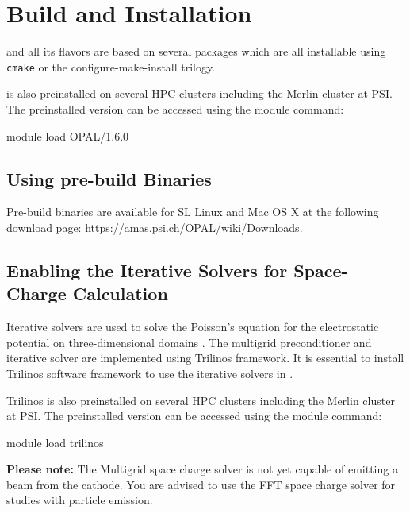 

\chapter{Build and Installation}
\label{chp:installation}
\opal and all its flavors are based on several packages which are all installable using \texttt{cmake} or the configure-make-install trilogy.

\opal is also preinstalled on several HPC clusters including the Merlin cluster at PSI. The preinstalled version can be accessed
using the module command:
\begin{footnotesize}
\begin{example}
module load OPAL/1.6.0
\end{example}
\end{footnotesize}

\section{Using pre-build Binaries}
Pre-build binaries are available for SL Linux  and Mac OS X at the following download page: \url{https://amas.psi.ch/OPAL/wiki/Downloads}.

\section{Enabling the Iterative Solvers for Space-Charge Calculation}

Iterative solvers are used to solve the Poisson's equation for the electrostatic potential
on three-dimensional domains \cite{Adelmann:2009p543}.
The multigrid preconditioner and iterative solver are implemented using Trilinos framework. It is essential to install
Trilinos software framework to use the iterative solvers in \opal.

Trilinos is also preinstalled on several HPC clusters including the Merlin cluster at PSI. The preinstalled version can be accessed
using the module command:
\begin{footnotesize}
\begin{example}
module load trilinos
\end{example}
\end{footnotesize}

{\bf Please note:} The Multigrid space charge solver is not yet capable of emitting a beam from the cathode.  You are advised to use the FFT space charge solver for studies with particle emission.

